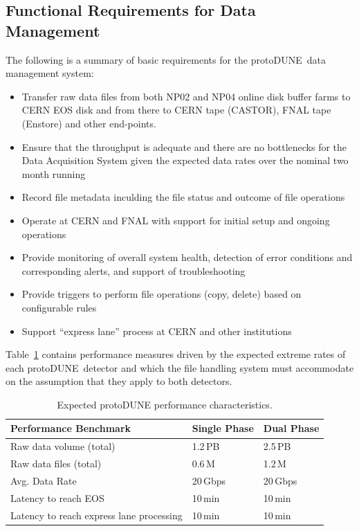 \documentclass[pdftex,12pt,letter]{article}
\newcommand{\pd}{protoDUNE\ }
\begin{document}
\subsection{Functional Requirements for Data Management}

The following is a summary of basic requirements for the \pd data management system:
\begin{itemize}

\item Transfer raw data files from both NP02 and NP04 online disk buffer farms
to CERN EOS disk and from there to CERN tape (CASTOR), FNAL tape (Enstore) and other end-points.

\item Ensure that the throughput is adequate and there are no bottlenecks for the Data Acquisition System
given the expected data rates over the nominal two month running%

\item Record file metadata inculding the file status and outcome of file operations

\item Operate at CERN and FNAL with support for initial setup and ongoing operations

\item Provide monitoring of overall system health, detection of error conditions and corresponding alerts, and support of troubleshooting

\item Provide triggers to perform file operations (copy, delete) based on configurable rules

\item Support ``express lane'' process at CERN and other institutions

\end{itemize}

\noindent
Table~\ref{fig:det_perf} contains performance measures driven by the expected extreme rates of each \pd detector
and which the file handling system must accommodate on the assumption that they apply to both detectors.


\begin{table}[tbh]
\centering
\begin{tabular}{l l l}
\hline
\textbf{Performance Benchmark} & \textbf{Single Phase} & \textbf{Dual Phase}\\
\hline
\hline
Raw data volume (total)                    & 1.2\,PB & 2.5\,PB \\
Raw data files (total)                      & 0.6\,M  & 1.2\,M\\
Avg. Data Rate                                & 20\,Gbps & 20\,Gbps \\
Latency to reach EOS                     & 10\,min & 10\,min\\
Latency to reach express lane processing & 10\,min & 10\,min\\
\hline
\end{tabular}
\caption{\label{fig:det_perf}Expected protoDUNE performance characteristics.}
\end{table}
\end{document}
